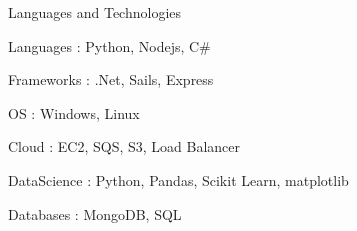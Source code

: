 

\begin{cventries}

  \cventry
    {Languages and Technologies}
    {}
    {}
    {}
    {
      \begin{cvitems} %
        \item {Languages : Python, Nodejs, C\#}
	\item {Frameworks : .Net, Sails, Express}	
	\item {OS : Windows, Linux}	
	\item {Cloud : EC2, SQS, S3, Load Balancer}	
	\item {DataScience : Python, Pandas, Scikit Learn, matplotlib}	
	\item {Databases : MongoDB, SQL}	
      \end{cvitems}
    }

\end{cventries}
